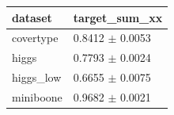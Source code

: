 \begin{tabular}{ll}
\toprule
dataset & target\_sum\_xx \\
\midrule
covertype & 0.8412 $\pm$ 0.0053 \\
higgs & 0.7793 $\pm$ 0.0024 \\
higgs\_low & 0.6655 $\pm$ 0.0075 \\
miniboone & 0.9682 $\pm$ 0.0021 \\
\bottomrule
\end{tabular}
